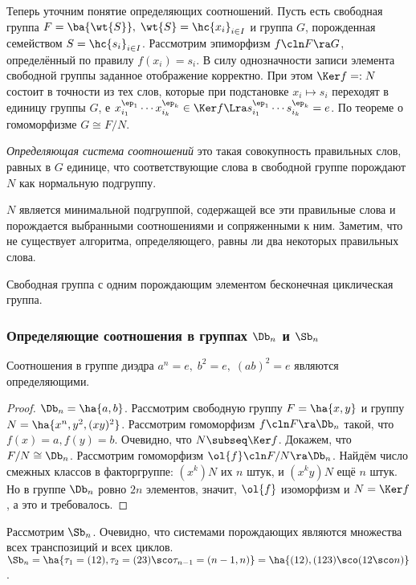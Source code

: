 \documentclass[a4paper]{article}
\begin{document}
Теперь уточним понятие определяющих соотношений. Пусть есть свободная группа $F = \ba{\wt{S}}, \; \wt{S} =
\hc{x_i}_{i \in I}$ и группа $G$, порожденная  семейством $S = \hc{s_i}_{i \in I}$. Рассмотрим эпиморфизм
$f\cln F\ra G$, определённый по правилу $f(x_i) = s_i$. В силу однозначности записи элемента свободной группы
заданное отображение корректно. При этом $\Ker f =: N$ состоит в точности из тех слов, которые при
подстановке $x_i \mapsto s_i$ переходят в единицу группы $G$, е $x_{i_1}^{\ep_1}\cdots x_{i_k}^{\ep_k}
\in \Ker f \Lra s_{i_1}^{\ep_1} \cdots s_{i_k}^{\ep_k}=e$. По теореме о гомоморфизме $G \cong F/N$.

\begin{df}
\emph{Определяющая система соотношений} это такая совокупность правильных слов, равных в $G$ единице,
что соответствующие слова в свободной группе порождают $N$ как нормальную подгруппу.
\end{df}

$N$ является минимальной подгруппой, содержащей все эти правильные слова и порождается выбранными
соотношениями и сопряженными к ним. Заметим, что не существует алгоритма, определяющего, равны ли два
некоторых правильных слова.

\begin{ex}
Свободная группа с одним порождающим элементом бесконечная циклическая группа.
\end{ex}

\subsubsection{Определяющие соотношения в группах $\Db_n$ и $\Sb_n$}

\begin{stm}
Соотношения в группе диэдра $a^n=e, \; b^2=e, \; (ab)^2=e$ являются определяющими.
\end{stm}
\begin{proof}
$\Db_n=\ha{a,b}$. Рассмотрим свободную группу $F=\ha{x,y}$ и группу $N = \ha{x^n,y^2, (xy)^2}$.  Рассмотрим
гомоморфизм $f\cln F \ra \Db_n$ такой, что $f(x)=a, f(y)=b$. Очевидно, что $N \subseq \Ker f$. Докажем, что $F/N \cong
\Db_n$. Рассмотрим гомоморфизм $\ol{f}\cln F/N\ra \Db_n$. Найдём число смежных классов в факторгруппе:
$(x^k)N$ их $n$ штук, и $(x^k y)N$ ещё $n$ штук. Но в группе $\Db_n$ ровно $2n$ элементов, значит,
$\ol{f}$ изоморфизм и $N=\Ker f$, а это и требовалось.
\end{proof}

Рассмотрим $\Sb_n$. Очевидно, что системами порождающих являются множества всех транспозиций и всех циклов.
$\Sb_n = \ha{\tau_1=(12), \tau_2=(23) \sco \tau_{n-1}=(n-1,n)} = \ha{(12), (123) \sco (12 \sco n)}$.
\end{document}
